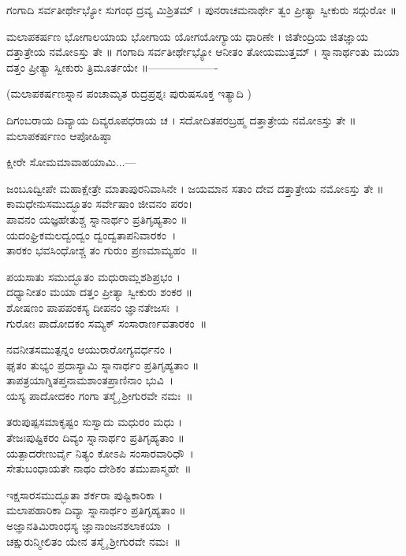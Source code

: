 ಗಂಗಾದಿ ಸರ್ವತೀರ್ಥೇಭ್ಯೋ ಸುಗಂಧ ದ್ರವ್ಯ ಮಿಶ್ರಿತಮ್ ।
ಪುನರಾಚಮನಾರ್ಥೇ ತ್ವಂ ಪ್ರೀತ್ಯಾ ಸ್ವೀಕುರು ಸದ್ಗುರೋ ॥

ಮಲಾಪಕರ್ಷಣ
ಭೋಗಾಲಯಾಯ ಭೋಗಾಯ ಯೋಗಯೋಗ್ಯಾಯ ಧಾರಿಣೇ ।
ಜಿತೇಂದ್ರಿಯ ಜಿತಜ್ಞಾಯ ದತ್ತಾತ್ರೇಯ ನಮೋಽಸ್ತು ತೇ ॥
ಗಂಗಾದಿ ಸರ್ವತೀರ್ಥೇಭ್ಯೋ ಆನೀತಂ ತೋಯಮುತ್ತಮ್ ।
ಸ್ನಾನಾರ್ಥಂತು ಮಯಾ ದತ್ತಂ ಪ್ರೀತ್ಯಾ ಸ್ವೀಕುರು ತ್ರಿಮೂರ್ತಯೇ ॥-------------------

(ಮಲಾಪಕರ್ಷಣಸ್ನಾನ ಪಂಚಾಮೃತ ರುದ್ರಪ್ರಶ್ನಃ ಪುರುಷಸೂಕ್ತ ಇತ್ಯಾದಿ )

ದಿಗಂಬರಾಯ ದಿವ್ಯಾಯ ದಿವ್ಯರೂಪಧರಾಯ ಚ ।
ಸದೋದಿತಪರಬ್ರಹ್ಮ ದತ್ತಾತ್ರೇಯ ನಮೋಽಸ್ತು ತೇ ॥
ಮಲಾಪಕರ್ಷಣಂ ಆಪೋಹಿಷ್ಠಾ

ಕ್ಷೀರೇ ಸೋಮಮಾವಾಹಯಾಮಿ...---

ಜಂಬೂದ್ವೀಪೇ ಮಹಾಕ್ಷೇತ್ರೇ ಮಾತಾಪುರನಿವಾಸಿನೇ ।
ಜಯಮಾನ ಸತಾಂ ದೇವ ದತ್ತಾತ್ರೇಯ ನಮೋಽಸ್ತು ತೇ ॥
ಕಾಮಧೇನುಸಮುದ್ಭೂತಂ ಸರ್ವೇಷಾಂ ಜೀವನಂ ಪರಂ।\\
ಪಾವನಂ ಯಜ್ಞಹೇತುಶ್ಚ ಸ್ನಾನಾರ್ಥಂ ಪ್ರತಿಗೃಹ್ಯತಾಂ ॥ \\
ಯದಂಘ್ರಿಕಮಲದ್ವಂದ್ವಂ ದ್ವಂದ್ವತಾಪನಿವಾರಕಂ~।\\
ತಾರಕಂ ಭವಸಿಂಧೋಶ್ಚ ತಂ ಗುರುಂ ಪ್ರಣಮಾಮ್ಯಹಂ~॥

ಪಯಸಾತು ಸಮುದ್ಭೂತಂ ಮಧುರಾಮ್ಲಶಶಿಪ್ರಭಂ ।\\
ದಧ್ಯಾನೀತಂ ಮಯಾ ದತ್ತಂ ಪ್ರೀತ್ಯಾ ಸ್ವೀಕುರು ಶಂಕರ ॥\\
ಶೋಷಣಂ ಪಾಪಪಂಕಸ್ಯ ದೀಪನಂ ಜ್ಞಾನತೇಜಸಃ~।\\
ಗುರೋಃ ಪಾದೋದಕಂ ಸಮ್ಯಕ್ ಸಂಸಾರಾರ್ಣವತಾರಕಂ~॥

ನವನೀತಸಮುತ್ಪನ್ನಂ ಆಯುರಾರೋಗ್ಯವರ್ಧನಂ ।\\
ಘೃತಂ ತುಭ್ಯಂ ಪ್ರದಾಸ್ಯಾಮಿ ಸ್ನಾನಾರ್ಥಂ ಪ್ರತಿಗೃಹ್ಯತಾಂ ॥\\
ತಾಪತ್ರಯಾಗ್ನಿತಪ್ತನಾಮಶಾಂತಪ್ರಾಣಿನಾಂ ಭುವಿ~।\\
ಯಸ್ಯ ಪಾದೋದಕಂ ಗಂಗಾ ತಸ್ಮೈ ಶ್ರೀಗುರವೇ ನಮಃ~॥

ತರುಪುಷ್ಪಸಮಾಕೃಷ್ಟಂ ಸುಸ್ವಾದು ಮಧುರಂ ಮಧು ।\\
ತೇಜಃಪುಷ್ಟಿಕರಂ ದಿವ್ಯಂ ಸ್ನಾನಾರ್ಥಂ ಪ್ರತಿಗೃಹ್ಯತಾಂ ॥ \\
ಯತ್ಪಾದರೇಣುರ್ವೈ ನಿತ್ಯಂ ಕೋಽಪಿ ಸಂಸಾರವಾರಿಧೌ~।\\
ಸೇತುಬಂಧಾಯತೇ ನಾಥಂ ದೇಶಿಕಂ ತಮುಪಾಸ್ಮಹೇ~॥

ಇಕ್ಷಸಾರಸಮುದ್ಭೂತಾ ಶರ್ಕರಾ ಪುಷ್ಟಿಕಾರಿಕಾ ।\\
ಮಲಾಪಹಾರಿಕಾ ದಿವ್ಯಾ ಸ್ನಾನಾರ್ಥಂ ಪ್ರತಿಗೃಹ್ಯತಾಂ ॥\\
ಅಜ್ಞಾನತಿಮಿರಾಂಧಸ್ಯ ಜ್ಞಾನಾಂಜನಶಲಾಕಯಾ~।\\
ಚಕ್ಷುರುನ್ಮೀಲಿತಂ ಯೇನ ತಸ್ಮೈ ಶ್ರೀಗುರವೇ ನಮಃ~॥

